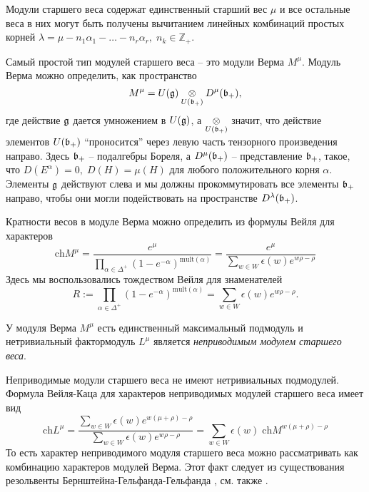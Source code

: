 Модули старшего веса содержат единственный старший вес $\mu$ и все остальные веса в них могут быть получены вычитанием линейных комбинаций простых корней $\lambda=\mu-n_{1}\alpha_{1}-\dots-n_{r}\alpha_{r},\; n_{k}\in \mathbb{Z} _{+}$.

Самый простой тип модулей старшего веса -- это модули Верма $M^{\mu}$. Модуль Верма можно определить, как пространство
\begin{equation}
  \label{eq:17}
  M^{\mu}=U(\mathfrak{g})\underset{U(\mathfrak{b}_{+})}{\otimes} D^{\mu}(\mathfrak{b}_{+}),
\end{equation}
где действие $\mathfrak{g}$ дается умножением в $U(\mathfrak{g})$, а
$\underset{U(\mathfrak{b}_{+})}{\otimes}$ значит, что действие элементов $U(\mathfrak{b}_{+})$ ``проносится'' через левую часть тензорного произведения направо. Здесь $\mathfrak{b}_{+}$ -- подалгебры Бореля, а $D^{\mu}(\mathfrak{b}_{+})$ -- представление $\mathfrak{b}_{+}$, такое, что $D(E^{\alpha})=0,\; D(H)=\mu(H)$ для любого положительного корня $\alpha$.
Элементы  $\mathfrak{g}$ действуют слева и мы должны прокоммутировать все элементы $\mathfrak{b}_{+}$ направо, чтобы они могли подействовать на пространстве $D^{\lambda}(\mathfrak{b}_{+})$.

Кратности весов в модуле Верма можно определить из формулы Вейля для характеров
\begin{equation}
  \label{eq:122}
  \mathrm{ch} M^{\mu}=\frac{e^{\mu}}{\prod_{\alpha\in \Delta^{+}} \left( 1-e^{-\alpha}\right)^{\mathrm{mult}(\alpha)}}=\frac{e^{\mu}}{\sum_{w\in W} \epsilon(w) e^{w\rho-\rho}}
\end{equation}
Здесь мы воспользовались тождеством Вейля для знаменателей
\begin{equation}
  \label{eq:123}
  R:=\prod_{\alpha\in \Delta^{+}} \left( 1-e^{-\alpha}\right)^{\mathrm{mult}(\alpha)}=\sum_{w\in W} \epsilon(w) e^{w\rho-\rho}.
\end{equation}

У модуля Верма  $M^{\mu}$ есть единственный максимальный подмодуль и нетривиальный фактормодуль $L^{\mu}$ является 
{\it неприводимым модулем старшего веса}. 

Неприводимые модули старшего веса не имеют нетривиальных подмодулей. 
Формула Вейля-Каца для характеров неприводимых модулей старшего веса имеет вид
\begin{equation}
  \label{eq:13}
  \mathrm{ch} L^{\mu}=\frac{\sum_{w\in W} \epsilon(w) e^{w(\mu+\rho)-\rho}}{\sum_{w\in W}\epsilon(w) e^{w\rho-\rho}}=\sum_{w\in W} \epsilon(w)\; \mathrm{ch} M^{w(\mu+\rho)-\rho}
\end{equation}
То есть характер неприводимого модуля старшего веса можно рассматривать как комбинацию характеров модулей Верма. Этот факт следует из существования резольвенты Бернштейна-Гельфанда-Гельфанда \cite{bernstein1976category,bernstein1971structure}, см. также
\cite{humphreys2008representations}.

